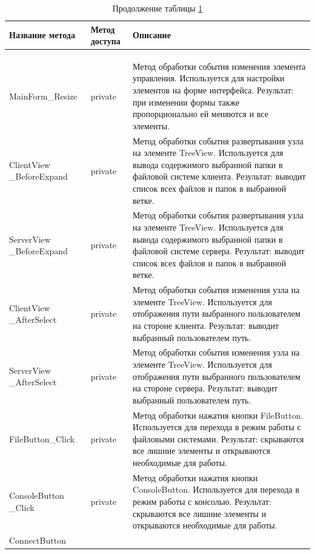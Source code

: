 \begin{longtable}[l]{|p{4.25cm}|p{2.35cm}|p{8.1cm}|}
	\caption{Описание методов класса Client\label{class:tableClient}}\\
	\hline \centrow Название метода & \centrow Метод
	доступа & \centrow Описание \\
	\hline \centrow 1 & \centrow 2 & \centrow 3\\
	\endfirsthead
	\caption*{Продолжение таблицы \ref{class:tableClient}}\\
	\hline \centrow 1 & \centrow 2 & \centrow 3\\
	\finishhead
	\hline MainForm\_Resize & private & Метод обработки события изменения элемента управления. Используется для настройки элементов на форме интерфейса.
	Результат: при изменении формы также пропорционально ей меняются и все элементы.\\
	\hline ClientView
	\_BeforeExpand & private & Метод обработки события развертывания узла на элементе TreeView. Используется для вывода содержимого выбранной папки в файловой системе клиента.
	Результат: выводит список всех файлов и папок в выбранной ветке.\\
	\hline ServerView
	\_BeforeExpand & private & Метод обработки события развертывания узла на элементе TreeView. Используется для вывода содержимого выбранной папки в файловой системе сервера.
	Результат: выводит список всех файлов и папок в выбранной ветке.\\
	\hline ClientView
	\_AfterSelect & private & Метод обработки события изменения узла на элементе TreeView. Используется для отображения пути выбранного пользователем на стороне клиента.
	Результат: выводит выбранный пользователем путь.\\
	\hline ServerView
	\_AfterSelect & private & Метод обработки события изменения узла на элементе TreeView. Используется для отображения пути выбранного пользователем на стороне сервера.
	Результат: выводит выбранный пользователем путь.\\
	\hline FileButton\_Click & private & Метод обработки нажатия кнопки FileButton. Используется для перехода в режим работы с файловыми системами.
	Результат: скрываются все лишние элементы и открываются необходимые для работы.\\
	\hline ConsoleButton
	\_Click & private & Метод обработки нажатия кнопки ConsoleButton. Используется для перехода в режим работы с консолью.
	Результат: скрываются все лишние элементы и открываются необходимые для работы.\\
	\hline ConnectButton

\end{longtable}
